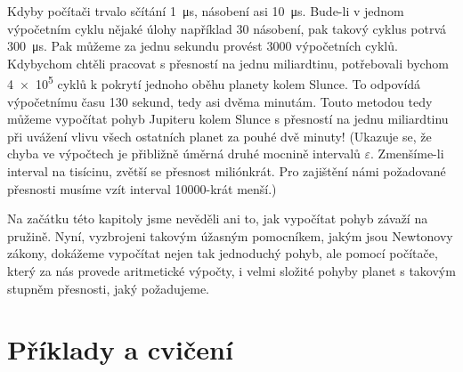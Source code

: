     Kdyby počítači trvalo sčítání \SI{1}{\us}, násobení asi \SI{10}{\us}. Bude-li v 
    jednom výpočetním cyklu nějaké úlohy například \num{30} násobení, pak takový cyklus potrvá 
    \SI{300}{\us}. Pak můžeme za jednu sekundu provést \num{3000} výpočetních cyklů. Kdybychom 
    chtěli pracovat s přesností na jednu miliardtinu, potřebovali bychom \num{4e5} cyklů k pokrytí 
    jednoho oběhu planety kolem Slunce. To odpovídá výpočetnímu času 130 sekund, tedy asi dvěma 
    minutám. Touto metodou tedy můžeme vypočítat pohyb Jupiteru kolem Slunce s přesností na 
    jednu miliardtinu při uvážení vlivu všech ostatních planet za pouhé dvě minuty! (Ukazuje se, že 
    chyba ve výpočtech je přibližně úměrná druhé mocnině intervalů \(\varepsilon\). Zmenšíme-li 
    interval na tisícinu, zvětší se přesnost miliónkrát. Pro zajištění námi požadované přesnosti 
    musíme vzít interval \num{10000}-krát menší.)
    
    Na začátku této kapitoly jsme nevěděli ani to, jak vypočítat pohyb závaží na pružině. Nyní, 
    vyzbrojeni takovým úžasným pomocníkem, jakým jsou Newtonovy zákony, dokážeme vypočítat nejen 
    tak jednoduchý pohyb, ale pomocí počítače, který za nás provede aritmetické výpočty, i velmi 
    složité pohyby planet s takovým stupněm přesnosti, jaký požadujeme.
    
  \section{Příklady a cvičení}
        

